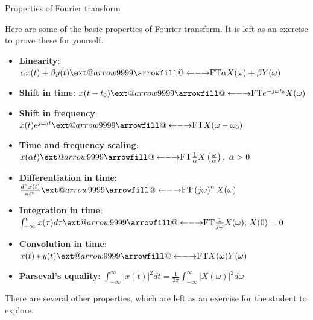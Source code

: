 \documentclass{beamer}
\makeatletter
\newcommand\xleftrightarrow[2][]{%
  \ext@arrow 9999{\longleftrightarrowfill@}{#1}{#2}}
\newcommand\longleftrightarrowfill@{%
  \arrowfill@\leftarrow\relbar\rightarrow}
\makeatother
\begin{document}
\begin{frame}{Properties of Fourier transform}

Here are some of the basic properties of Fourier transform. It is left as an exercise to prove these for yourself.

\begin{itemize}
\item \textbf{Linearity}: $\alpha x(t) + \beta y(t) \xleftrightarrow{\text{FT}} \alpha X(\omega) + \beta Y(\omega)$
\item \textbf{Shift in time}: $ x(t-t_0) \xleftrightarrow{\text{FT}} e^{-j\omega t_0}X(\omega)$
\item \textbf{Shift in frequency}: $ x(t)e^{j\omega_0 t} \xleftrightarrow{\text{FT}} X(\omega - \omega_0) $
\item \textbf{Time and frequency scaling}: $ x(\alpha t) \xleftrightarrow{\text{FT}} \frac{1}{\alpha} X\left(\frac{\omega}{\alpha}\right), \,\, \alpha > 0 $
\item \textbf{Differentiation in time}: $\frac{d^nx(t)}{dt^n} \xleftrightarrow{\text{FT}} \left(j\omega\right)^nX(\omega)$
\item \textbf{Integration in time}: $\int_{-\infty}^{t}x(\tau)d\tau  \xleftrightarrow{\text{FT}} \frac{1}{j\omega}X(\omega); \, X(0) = 0$
\item \textbf{Convolution in time}: $x(t) * y(t) \xleftrightarrow{\text{FT}} X(\omega)Y(\omega) $
\item \textbf{Parseval's equality}: $\int_{-\infty}^{\infty}\left|x(t)\right|^2dt = \frac{1}{2\pi}\int_{-\infty}^{\infty}\left|X(\omega)\right|^2d\omega$
\end{itemize}

There are several other properties, which are left as an exercise for the student to explore.
\end{frame}
\end{document}
